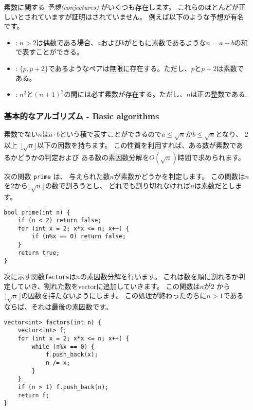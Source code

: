 素数に関する \emph{予想(conjectures)} がいくつも存在します。
これらのほとんどが正しいとされていますが証明はされていません。
例えば以下のような予想が有名です。

\begin{itemize}
\item {}:
$n > 2$は偶数である場合、$a$および$b$がともに素数であるような$n = a + b$の和で表すことができる。
\item {}:
$\{p,p+2\}$であるようなペアは無限に存在する。ただし、$p$と$p+2$は素数である。
\item {}:
$n^2$と$(n+1)^2$の間には必ず素数が存在する。ただし、$n$は正の整数である.
\end{itemize}

\subsubsection{基本的なアルゴリズム - Basic algorithms}

素数でない$n$は$a \cdot b$という積で表すことができるので$a \le \sqrt n$か$b \le \sqrt n$となり、
$2$ 以上 $\lfloor \sqrt n \rfloor$以下の因数を持ちます。
この性質を利用すれば、ある数が素数であるかどうかの判定および
ある数の素因数分解を$O(\sqrt n)$時間で求められます。

次の関数 \texttt{prime} は、
与えられた数$n$が素数かどうかを判定します。
この関数は$n$を$2$から$\lfloor \sqrt n \rfloor$の数で割ろうとし、
どれでも割り切れなければ$n$は素数だとします。

\begin{lstlisting}
bool prime(int n) {
    if (n < 2) return false;
    for (int x = 2; x*x <= n; x++) {
        if (n%x == 0) return false;
    }
    return true;
}
\end{lstlisting}

\noindent
次に示す関数\texttt{factors}は$n$の素因数分解を行います。
これは数を順に割れるか判定していき、割れた数をvectorに追加していきます。
この関数は$n$が$2$ から $\lfloor \sqrt n \rfloor$の因数を持たないようにします。
この処理が終わったのちに$n>1$であるならば、それは最後の素因数です。
\begin{lstlisting}
vector<int> factors(int n) {
    vector<int> f;
    for (int x = 2; x*x <= n; x++) {
        while (n%x == 0) {
            f.push_back(x);
            n /= x;
        }
    }
    if (n > 1) f.push_back(n);
    return f;
}
\end{lstlisting}

